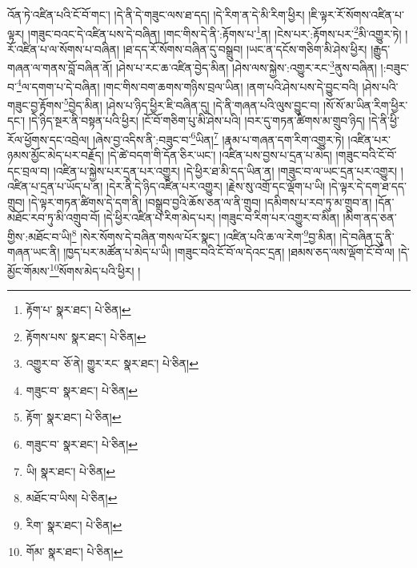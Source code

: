 འོན་ཏེ་འཛིན་པའི་ངོ་བོ་གང་། །དེ་ནི་དེ་གཟུང་ལས་ཐ་དད། །དེ་རིག་ན་དེ་མི་རིག་ཕྱིར། །ཇི་ལྟར་རོ་སོགས་འཛིན་པ་ལྟར། །གཟུང་བའང་དེ་འཛིན་པས་དེ་བཞིན། །གང་གིས་དེ་ནི་:རྟོགས་པ་\footnote{རྟོག་པ་  སྣར་ཐང་།  པེ་ཅིན། }ན། །ངེས་པར་:རྟོགས་པར་\footnote{རྟོགས་པས་  སྣར་ཐང་།  པེ་ཅིན། }མི་འགྱུར་ཏེ། །རོ་འཛིན་པ་ལ་སོགས་པ་བཞིན། །ཐ་དད་རོ་སོགས་བཞིན་དུ་བསྒྲུབ། །ཡང་ན་དངོས་གཅིག་མི་ཤེས་ཕྱིར། །རྒྱུད་གཞན་ལ་གནས་བློ་བཞིན་ནོ། །ཤེས་པ་རང་ཆ་འཛིན་བྱེད་མིན། །ཤེས་ལས་སྐྱེས་:འགྱུར་རང་\footnote{འགྱུར་བ་  ཅོ་ནེ། གྱུར་རང་  སྣར་ཐང་།  པེ་ཅིན། }ནུས་བཞིན། །:བཟུང་བ་\footnote{གཟུང་བ་  སྣར་ཐང་།  པེ་ཅིན། }ལ་དགག་པ་དེ་བཞིན། །གང་གིས་བག་ཆགས་གཉིས་བྲལ་ཡིན། །ནག་པའི་ཤེས་པས་དེ་བྱུང་བའི། །ཤེས་པའི་གཟུང་བྱ་རྟོགས་\footnote{རྟོག་  སྣར་ཐང་།  པེ་ཅིན། }བྱེད་མིན། །ཤེས་པ་ཉིད་ཕྱིར་ཇི་བཞིན་དུ། །དེ་ནི་གཞན་པའི་ལུས་བྱུང་བ། །སོ་སོ་མ་ཡིན་རིག་ཕྱིར་དང་། །དེ་ཉིད་སྔར་ནི་བསྟན་པའི་ཕྱིར། །ངོ་བོ་གཅིག་པུ་མི་ཤེས་པའི། །བར་དུ་གཏན་ཚིགས་མ་གྲུབ་ཉིད། །དེ་ནི་ཕྱི་རོལ་ཕྱོགས་དང་འབྲེལ། །ཞེས་བྱ་འདིས་ནི་:བཟུང་བ་\footnote{གཟུང་བ་  སྣར་ཐང་།  པེ་ཅིན། }ཡིན།\footnote{ཡི།  སྣར་ཐང་།  པེ་ཅིན། } །རྣམ་པ་གཞན་དག་རིག་འགྱུར་ཏེ། །འཛིན་པར་ཉམས་མྱོང་མེད་པར་བརྗོད། །དེ་ཚེ་བདག་གི་དོན་ཅིར་ཡང་། །འཛིན་པས་བྱས་པ་དྲན་པ་མེད། །གཟུང་བའི་ངོ་བོ་དང་བྲལ་བ། །འཛིན་པ་སྐྱེས་པར་དྲན་པར་འགྱུར། །དེ་ཕྱིར་ཐ་མི་དད་ཡིན་ན། །གཟུང་བ་ལ་ཡང་དྲན་པར་འགྱུར། །འཛིན་པ་དྲན་པ་ཡོད་པ་ན། །དེར་ནི་དེ་ཉིད་འཛིན་པར་འགྱུར། །རྗེས་སུ་འགྲོ་དང་ལྡོག་པ་ཡི། །དེ་ལྟར་དེ་དག་ཐ་དད་གྲུབ། །དེ་ལྟར་གཏན་ཚིགས་དེ་དག་ནི། །བསྒྲུབ་བྱའི་ཆོས་ཅན་ལ་ནི་གྲུབ། །དམིགས་པ་རབ་ཏུ་མ་གྲུབ་ན། །དོན་མཐོང་རབ་ཏུ་མི་འགྲུབ་བོ། །དེ་ཕྱིར་འཛིན་པ་རིག་མེད་པར། །གཟུང་བ་རིག་པར་འགྱུར་བ་མིན། །མིག་ནད་ཅན་གྱིས་:མཐོང་བ་ཡི།\footnote{མཐོང་བ་ཡིས།  པེ་ཅིན། } །སེར་སོགས་དེ་བཞིན་གསལ་པོར་སྣང་། །འཛིན་པའི་ཆ་ལ་རེག་\footnote{རིག་  སྣར་ཐང་།  པེ་ཅིན། }བྱ་མིན། །དེ་བཞིན་དུ་ནི་གཞན་ཡང་ནི། །ཁྱད་པར་མཚོན་པ་མེད་པ་ཡི། །གཟུང་བའི་ངོ་བོ་ལ་དེའང་དྲན། །ཐམས་ཅད་ལས་ལྡོག་ངོ་བོ་ལ། །དེ་མྱོང་གོམས་\footnote{གོམ་  སྣར་ཐང་།  པེ་ཅིན། }སོགས་མེད་པའི་ཕྱིར། །
